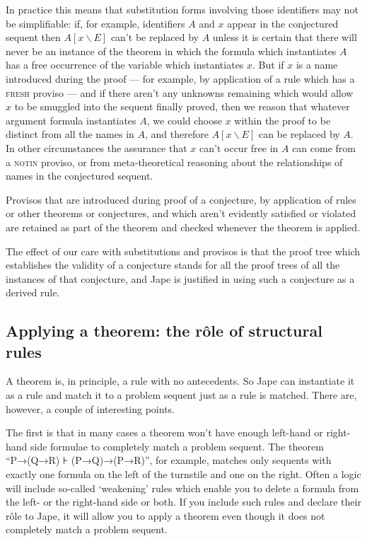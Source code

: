 In practice this means that substitution forms involving those identifiers may not be simplifiable: if, for example, identifiers $A$ and $x$ appear in the conjectured sequent then $A[x\backslash E]$ can't be replaced by $A$ unless it is certain that there will never be an instance of the theorem in which the formula which instantiates $A$ has a free occurrence of the variable which instantiates $x$. But if $x$ is a name introduced during the proof --- for example, by application of a rule which has a \textsc{fresh} proviso --- and if there aren't any unknowns remaining which would allow $x$ to be smuggled into the sequent finally proved, then we reason that whatever argument formula instantiates $A$, we could choose $x$ within the proof to be distinct from all the names in $A$, and therefore $A[x\backslash E]$ can be replaced by $A$. In other circumstances the assurance that $x$ can't occur free in $A$ can come from a \textsc{notin} proviso, or from meta-theoretical reasoning about the relationships of names in the conjectured sequent.

Provisos that are introduced during proof of a conjecture, by application of rules or other theorems or conjectures, and which aren't evidently satisfied or violated are retained as part of the theorem and checked whenever the theorem is applied.

The effect of our care with substitutions and provisos is that the proof tree which establishes the validity of a conjecture stands for all the proof trees of all the instances of that conjecture, and Jape is justified in using such a conjecture as a derived rule.

\subsection{Applying a theorem: the r\^{o}le of structural rules}
\label{sec:basics:application}

A theorem is, in principle, a rule with no antecedents. So Jape can instantiate it as a rule and match it to a problem sequent just as a rule is matched. There are, however, a couple of interesting points.

The first is that in many cases a theorem won't have enough left-hand or right-hand side formulae to completely match a problem sequent. The theorem ``P→(Q→R) ⊦ (P→Q)→(P→R)'', for example, matches only sequents with exactly one formula on the left of the turnstile and one on the right. Often a logic will include so-called `weakening' rules which enable you to delete a formula from the left- or the right-hand side or both. If you include such rules and declare their r\^{o}le to Jape, it will allow you to apply a theorem even though it does not completely match a problem sequent.

